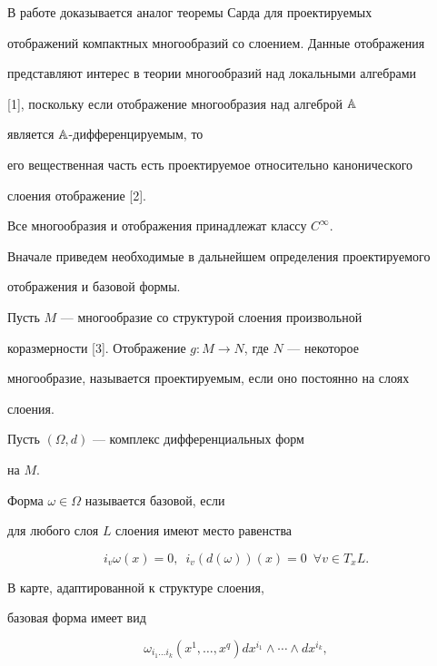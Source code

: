 В работе доказывается аналог теоремы Сарда для проектируемых


отображений компактных многообразий со слоением. Данные отображения


представляют интерес в теории многообразий над локальными алгебрами


[1], поскольку если отображение многообразия над алгеброй $\Bbb A$


является $\Bbb A$-дифференцируемым, то


его вещественная часть есть проектируемое относительно канонического


слоения отображение [2].





Все многообразия и отображения принадлежат классу $C^{\infty}$.





Вначале приведем необходимые в дальнейшем определения проектируемого


отображения и базовой формы.





Пусть $M$ --- многообразие со структурой слоения произвольной


коразмерности [3]. Отображение $g : M \to N$, где $N$ --- некоторое


многообразие, называется проектируемым, если оно постоянно на слоях


слоения.





Пусть $(\Omega, d)$ --- комплекс дифференциальных форм


на $M$.


Форма $\omega \in \Omega$ называется базовой, если


для любого слоя $L$ слоения имеют место равенства


$$


i_v\omega (x) =0, \ \; i_v(d(\omega ))(x) = 0\ \; \forall v\in T_xL.


$$


В карте, адаптированной к структуре слоения,


базовая форма имеет вид


$$


\omega_{i_1\dotsc i_k}(x^1,\dotsc,x^q)


dx^{i_1}\land\dotsb \land dx^{i_k},


$$



